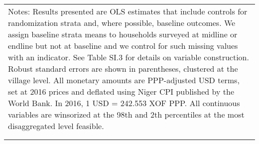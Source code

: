 \begin{longtable}{llcccccccccc}
\multicolumn{12}{p{\textwidth}}{{Notes: Results presented are OLS estimates that include controls for randomization strata and, where possible, baseline outcomes. We assign baseline strata means to households surveyed at midline or endline but not at baseline and we control for such missing values with an indicator. See Table SI.3 for details on variable construction. Robust standard errors are shown in parentheses, clustered at the village level. All monetary amounts are PPP-adjusted USD terms, set at 2016 prices and deflated using Niger CPI published by the World Bank. In 2016, 1 USD = 242.553 XOF PPP. All continuous variables are winsorized at the 98th and 2th percentiles at the most disaggregated level feasible. }} \\                                                                                                                                                       
\multicolumn{12}{p{\textwidth}}{{}} \\                                                                                                                                                                                                                                                                                                                                                                                                                                                                                                                                                                                                                                                                                                                                                                                                                                                                            
\endlastfoot                                                                                                                                                                                                                                                                                                                                                                                                                                                                                                                                                                                                                                                                                                                                                                                                                                                                                                      

\end{longtable}
